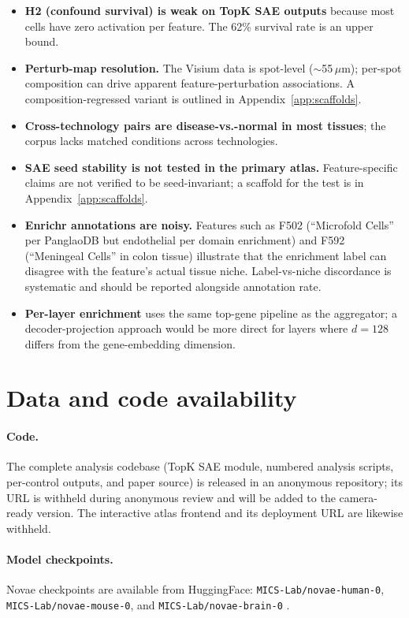 \documentclass[11pt]{article}
\begin{document}
\begin{itemize}
\item \textbf{H2 (confound survival) is weak on TopK SAE outputs}
      because most cells have zero activation per feature. The 62\%
      survival rate is an upper bound.
\item \textbf{Perturb-map resolution.} The Visium data is spot-level
      ($\sim$55\,$\mu$m); per-spot composition can drive apparent
      feature-perturbation associations. A composition-regressed
      variant is outlined in Appendix~\ref{app:scaffolds}.
\item \textbf{Cross-technology pairs are disease-vs.-normal in most
      tissues}; the corpus lacks matched conditions across technologies.
\item \textbf{SAE seed stability is not tested in the primary atlas.}
      Feature-specific claims are not verified to be seed-invariant;
      a scaffold for the test is in Appendix~\ref{app:scaffolds}.
\item \textbf{Enrichr annotations are noisy.} Features such as F502
      (``Microfold Cells'' per PanglaoDB but endothelial per domain
      enrichment) and F592 (``Meningeal Cells'' in colon tissue)
      illustrate that the enrichment label can disagree with the
      feature's actual tissue niche. Label-vs-niche discordance is
      systematic and should be reported alongside annotation rate.
\item \textbf{Per-layer enrichment} uses the same top-gene pipeline as
      the aggregator; a decoder-projection approach would be more
      direct for layers where $d = 128$ differs from the gene-embedding
      dimension.
\end{itemize}

\section*{Data and code availability}

\paragraph{Code.}
The complete analysis codebase (TopK SAE module, numbered analysis
scripts, per-control outputs, and paper source) is released in an
anonymous repository; its URL is withheld during anonymous review
and will be added to the camera-ready version. The interactive
atlas frontend and its deployment URL are likewise withheld.

\paragraph{Model checkpoints.}
Novae checkpoints are available from
HuggingFace: \texttt{MICS-Lab/novae-human-0},
\texttt{MICS-Lab/novae-mouse-0}, and \texttt{MICS-Lab/novae-brain-0}
\citep{novae}.
\end{document}
